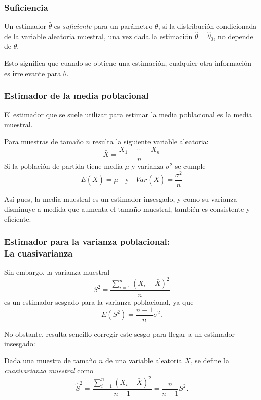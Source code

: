 \begin{frame}
\frametitle{Suficiencia}
\begin{definicion}
Un estimador $\hat \theta$ es \emph{suficiente} para un parámetro $\theta$, si la distribución condicionada de la variable aleatoria muestral, una vez dada la estimación $\hat \theta = \hat \theta_0$, no depende de $\theta$.
\end{definicion}

Esto significa que cuando se obtiene una estimación, cualquier otra información es irrelevante para $\theta$.
\end{frame}


\begin{frame}
\frametitle{Estimador de la media poblacional}
El estimador que se suele utilizar para estimar la media poblacional es la media muestral.

Para muestras de tamaño $n$ resulta la siguiente variable aleatoria:
\[
\bar X = \frac{X_1+\cdots+X_n}{n}
\]
Si la población de partida tiene media $\mu$ y varianza $\sigma^2$ se cumple
\[
E(\bar X) = \mu \quad \mbox{y} \quad Var(\bar X)=\frac{\sigma^2}{n}
\]

Así pues, la media muestral es un estimador insesgado, y como su varianza disminuye a medida que aumenta el tamaño muestral, también es consistente y eficiente.
\end{frame}


\begin{frame}
\frametitle{Estimador para la varianza poblacional:\\ La cuasivarianza}
Sin embargo, la varianza muestral
\[
S^2 = \frac{\sum_{i=1}^n (X_i-\bar X)^2}{n}
\]
es un estimador sesgado para la varianza poblacional, ya que
\[
E(S^2)= \frac{n-1}{n}\sigma^2.
\]

No obstante, resulta sencillo corregir este sesgo para llegar a un estimador insesgado:

\begin{definicion}
Dada una muestra de tamaño $n$ de una variable aleatoria $X$, se define la \emph{cuasivarianza muestral} como
\[
\hat{S}^2 = \frac{\sum_{i=1}^n (X_i-\bar X)^2}{n-1} = \frac{n}{n-1}S^2.
\]
\end{definicion}
\end{frame}


